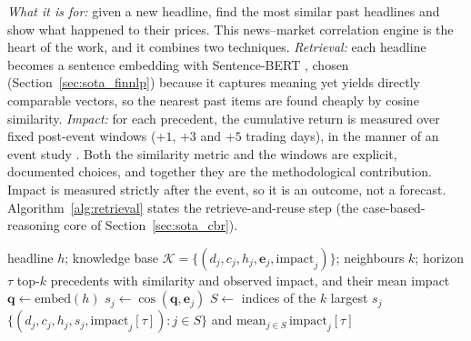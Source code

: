 \emph{What it is for:} given a new headline, find the most similar past headlines and show what happened to
their prices. This news--market correlation engine is the heart of the work, and it combines two
techniques. \emph{Retrieval:} each headline becomes a sentence embedding with Sentence-BERT
\autocite{reimers2019sbert}, chosen (Section~\ref{sec:sota_finnlp}) because it captures meaning yet yields
directly comparable vectors, so the nearest past items are found cheaply by cosine similarity.
\emph{Impact:} for each precedent, the cumulative return is measured over fixed post-event windows
($+1$, $+3$ and $+5$ trading days), in the manner of an event study
\autocite{fama1969adjustment, brown1985daily}. Both the similarity metric and the windows are explicit,
documented choices, and together they are the methodological contribution. Impact is measured strictly
after the event, so it is an outcome, not a forecast. Algorithm~\ref{alg:retrieval} states the
retrieve-and-reuse step (the case-based-reasoning core of Section~\ref{sec:sota_cbr}).

\begin{algorithm}[ht]
\caption{Precedent retrieval and impact reporting (news trigger).}
\label{alg:retrieval}
\begin{algorithmic}[1]
\Require headline $h$; knowledge base $\mathcal{K}=\{(d_j,c_j,h_j,\mathbf{e}_j,\text{impact}_j)\}$; neighbours $k$; horizon $\tau$
\Ensure top-$k$ precedents with similarity and observed impact, and their mean impact
\State $\mathbf{q} \gets \mathrm{embed}(h)$ 
  \State $s_j \gets \cos(\mathbf{q}, \mathbf{e}_j)$ 
\EndFor
\State $S \gets$ indices of the $k$ largest $s_j$
\State \Return $\{(d_j,c_j,h_j,s_j,\text{impact}_j[\tau]) : j \in S\}$ and $\mathrm{mean}_{j\in S}\,\text{impact}_j[\tau]$
\end{algorithmic}
\end{algorithm}


